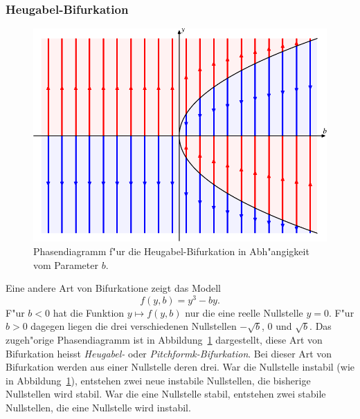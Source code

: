 \subsubsection{Heugabel-Bifurkation}
\begin{figure}
\centering
\includegraphics{chapters/images/bifurkation-2.pdf}
\caption{Phasendiagramm f"ur die Heugabel-Bifurkation in Abh"angigkeit vom
Parameter $b$.
\label{geometrie:pitchfork}}
\end{figure}
Eine andere Art von Bifurkatione zeigt das Modell
\[
f(y,b)=y^3-by.
\]
F"ur $b<0$ hat die Funktion $y\mapsto f(y,b)$ nur die eine
reelle Nullstelle $y=0$.
F"ur $b>0$ dagegen liegen die drei verschiedenen Nullstellen
$-\sqrt{b}$, $0$  und $\sqrt{b}$.
Das zugeh"orige Phasendiagramm ist in Abbildung~\ref{geometrie:pitchfork}
dargestellt, diese Art von Bifurkation heisst {\em Heugabel-}
oder {\em Pitchformk-Bifurkation}.
Bei dieser Art von Bifurkation werden aus einer Nullstelle deren drei.
War die Nullstelle instabil (wie in Abbildung~\ref{geometrie:pitchfork}),
entstehen zwei neue instabile Nullstellen, die bisherige Nullstellen 
wird stabil.
War die eine Nullstelle stabil, entstehen zwei stabile Nullstellen, die
eine Nullstelle wird instabil.

